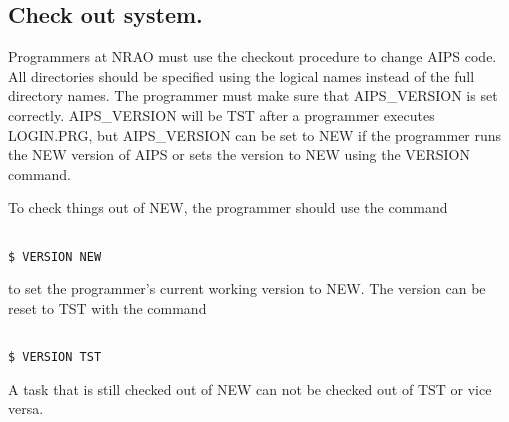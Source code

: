 \subsection{ Check out system.}

Programmers at NRAO must use the checkout procedure to change AIPS
code.  All directories should be specified using the logical names
instead of the full directory names.
The programmer must make sure that
AIPS\_VERSION is set correctly.  AIPS\_VERSION will be TST after a
programmer executes LOGIN.PRG, but AIPS\_VERSION can be set to
NEW if the programmer runs the NEW version of AIPS or sets the
version to NEW using the VERSION command.

To check things out of NEW, the programmer should use the
command
\begin{verbatim}

$ VERSION NEW

\end{verbatim}
to set the programmer's current working version to NEW.  The version
can be reset to TST with the command
\begin{verbatim}

$ VERSION TST

\end{verbatim}
A task that is still checked out of NEW can not be checked out of TST
or vice versa.


